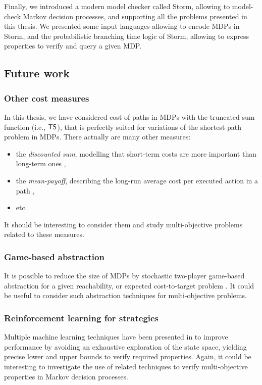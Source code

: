 Finally, we introduced a modern model checker called Storm, allowing to model-check Markov decision processes, and supporting all the problems presented in this thesis.
We presented some input languages allowing to encode MDPs in Storm, and the probabilistic branching time logic of Storm, allowing to express properties to verify and query a given MDP.

\subsection*{Future work}
  \subsubsection*{Other cost measures}
    In this thesis, we have considered cost of paths in MDPs with the truncated sum function (i.e., $\text{\sffamily TS}$), that is perfectly suited for variations of the shortest path problem in MDPs.
    There actually are many other measures:
    \begin{itemize}
      \item the \textit{discounted sum}, modelling that short-term costs are more important than long-term ones \cite{DBLP:journals/fmsd/RandourRS17},
      \item the \textit{mean-payoff}, describing the long-run average cost per executed action in a path \cite{DBLP:journals/corr/BruyereFRR13},
      \item etc.
    \end{itemize}
    It should be interesting to consider them and study multi-objective problems related to these measures.
  \subsubsection*{\textbf{Game-based abstraction}}
  It is possible to reduce the size of MDPs by stochastic two-player game-based abstraction for a given reachability, or expected cost-to-target problem \cite{DBLP:journals/fmsd/KattenbeltKNP10}.
  It could be useful to consider such abstraction techniques for multi-objective problems.

  \subsubsection*{\textbf{Reinforcement learning for strategies}}
     Multiple machine learning techniques have been presented in  \cite{10.1007/978-3-319-11936-6_8} to improve performance by avoiding an exhaustive exploration of the state space, yielding precise lower and upper bounds to verify required properties.
    Again, it could be interesting to investigate the use of related techniques to verify multi-objective properties in Markov decision processes.

